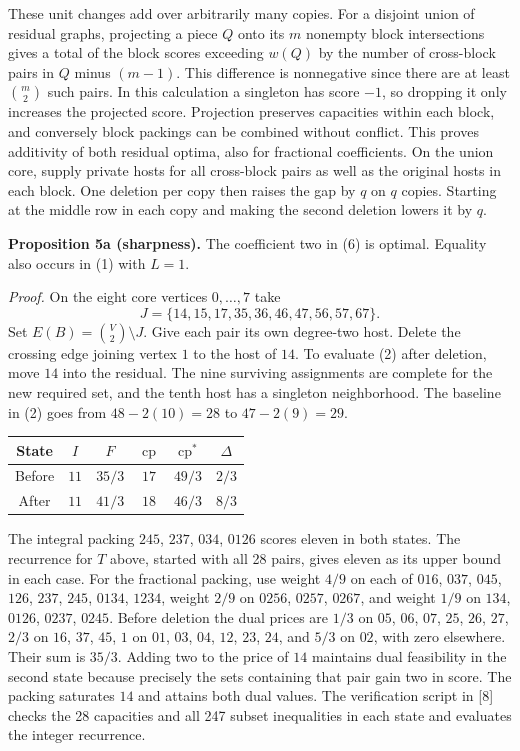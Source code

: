 \documentclass[english,11pt,a4paper]{article}
\newcounter{none}
\begin{document}
These unit changes add over arbitrarily many copies. For a disjoint union of residual graphs, projecting a piece \(Q\) onto its \(m\) nonempty block intersections gives a total of the block scores exceeding \(w(Q)\) by the number of cross-block pairs in \(Q\) minus \((m-1)\). This difference is nonnegative since there are at least \(\binom m2\) such pairs. In this calculation a singleton has score \(-1\), so dropping it only increases the projected score. Projection preserves capacities within each block, and conversely block packings can be combined without conflict. This proves additivity of both residual optima, also for fractional coefficients. On the union core, supply private hosts for all cross-block pairs as well as the original hosts in each block. One deletion per copy then raises the gap by \(q\) on \(q\) copies. Starting at the middle row in each copy and making the second deletion lowers it by \(q\).

\textbf{Proposition 5a (sharpness).} The coefficient two in (6) is optimal. Equality also occurs in (1) with \(L=1\).

\emph{Proof.} On the eight core vertices \(0,\ldots,7\) take \[
J=\{14,15,17,35,36,46,47,56,57,67\}.
\] Set \(E(B)=\binom{V}{2}\setminus J\). Give each pair its own degree-two host. Delete the crossing edge joining vertex \(1\) to the host of \(14\). To evaluate (2) after deletion, move \(14\) into the residual. The nine surviving assignments are complete for the new required set, and the tenth host has a singleton neighborhood. The baseline in (2) goes from \(48-2(10)=28\) to \(47-2(9)=29\).

\begin{center}
\begin{tabular}{cccccc}
\toprule
State & $I$ & $F$ & $\operatorname{cp}$ & $\operatorname{cp}^{\ast}$ & $\Delta$ \\
\midrule
Before & $11$ & $35/3$ & $17$ & $49/3$ & $2/3$ \\
After & $11$ & $41/3$ & $18$ & $46/3$ & $8/3$ \\
\bottomrule
\end{tabular}
\end{center}

The integral packing \(245\), \(237\), \(034\), \(0126\) scores eleven in both states. The recurrence for \(T\) above, started with all 28 pairs, gives eleven as its upper bound in each case. For the fractional packing, use weight \(4/9\) on each of \(016\), \(037\), \(045\), \(126\), \(237\), \(245\), \(0134\), \(1234\), weight \(2/9\) on \(0256\), \(0257\), \(0267\), and weight \(1/9\) on \(134\), \(0126\), \(0237\), \(0245\). Before deletion the dual prices are \(1/3\) on \(05\), \(06\), \(07\), \(25\), \(26\), \(27\), \(2/3\) on \(16\), \(37\), \(45\), \(1\) on \(01\), \(03\), \(04\), \(12\), \(23\), \(24\), and \(5/3\) on \(02\), with zero elsewhere. Their sum is \(35/3\). Adding two to the price of \(14\) maintains dual feasibility in the second state because precisely the sets containing that pair gain two in score. The packing saturates \(14\) and attains both dual values. The verification script in {[}8{]} checks the 28 capacities and all 247 subset inequalities in each state and evaluates the integer recurrence.
\end{document}
